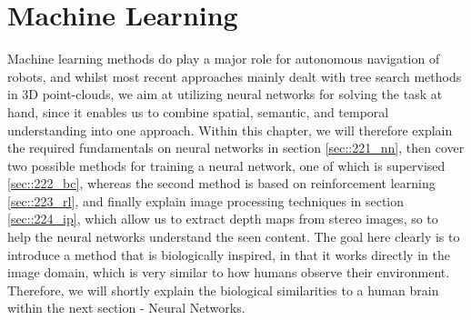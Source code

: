 \section{Machine Learning}  
\label{sec::22_ml}
Machine learning methods do play a major role for autonomous navigation of robots, and whilst most recent approaches mainly dealt with tree search methods in 3D point-clouds, we aim at utilizing neural networks for solving the task at hand, since it enables us to combine spatial, semantic, and temporal understanding into one approach. Within this chapter, we will therefore explain the required fundamentals on neural networks in section \ref{sec::221_nn}, then cover two possible methods for training a neural network, one of which is supervised \ref{sec::222_bc}, whereas the second method is based on reinforcement learning \ref{sec::223_rl}, and finally explain image processing techniques in section \ref{sec::224_ip}, which allow us to extract depth maps from stereo images, so to help the neural networks understand the seen content. The goal here clearly is to introduce a method that is biologically inspired, in that it works directly in the image domain, which is very similar to how humans observe their environment. Therefore, we will shortly explain the biological similarities to a human brain within the next section - Neural Networks.